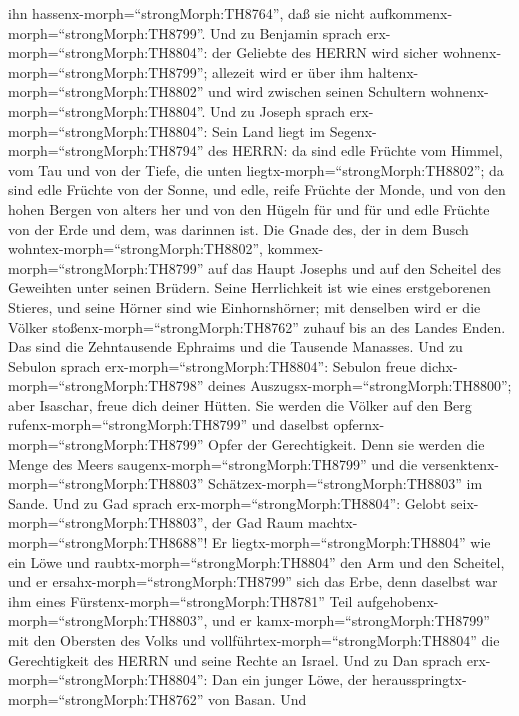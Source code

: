 ihn hassenx-morph=``strongMorph:TH8764'', daß sie nicht
aufkommenx-morph=``strongMorph:TH8799''.  Und zu Benjamin
sprach erx-morph=``strongMorph:TH8804'': der Geliebte des HERRN wird
sicher wohnenx-morph=``strongMorph:TH8799''; allezeit wird er über ihm
haltenx-morph=``strongMorph:TH8802'' und wird zwischen seinen Schultern
wohnenx-morph=``strongMorph:TH8804''.  Und zu Joseph sprach
erx-morph=``strongMorph:TH8804'': Sein Land liegt im
Segenx-morph=``strongMorph:TH8794'' des HERRN: da sind edle Früchte vom
Himmel, vom Tau und von der Tiefe, die unten
liegtx-morph=``strongMorph:TH8802'';  da sind edle Früchte
von der Sonne, und edle, reife Früchte der Monde,  und von
den hohen Bergen von alters her und von den Hügeln für und für
 und edle Früchte von der Erde und dem, was darinnen ist.
Die Gnade des, der in dem Busch wohntex-morph=``strongMorph:TH8802'',
kommex-morph=``strongMorph:TH8799'' auf das Haupt Josephs und auf den
Scheitel des Geweihten unter seinen Brüdern.  Seine
Herrlichkeit ist wie eines erstgeborenen Stieres, und seine Hörner sind
wie Einhornshörner; mit denselben wird er die Völker
stoßenx-morph=``strongMorph:TH8762'' zuhauf bis an des Landes Enden. Das
sind die Zehntausende Ephraims und die Tausende Manasses. 
Und zu Sebulon sprach erx-morph=``strongMorph:TH8804'': Sebulon freue
dichx-morph=``strongMorph:TH8798'' deines
Auszugsx-morph=``strongMorph:TH8800''; aber Isaschar, freue dich deiner
Hütten.  Sie werden die Völker auf den Berg
rufenx-morph=``strongMorph:TH8799'' und daselbst
opfernx-morph=``strongMorph:TH8799'' Opfer der Gerechtigkeit. Denn sie
werden die Menge des Meers saugenx-morph=``strongMorph:TH8799'' und die
versenktenx-morph=``strongMorph:TH8803''
Schätzex-morph=``strongMorph:TH8803'' im Sande.  Und zu Gad
sprach erx-morph=``strongMorph:TH8804'': Gelobt
seix-morph=``strongMorph:TH8803'', der Gad Raum
machtx-morph=``strongMorph:TH8688''! Er
liegtx-morph=``strongMorph:TH8804'' wie ein Löwe und
raubtx-morph=``strongMorph:TH8804'' den Arm und den Scheitel,
 und er ersahx-morph=``strongMorph:TH8799'' sich das Erbe,
denn daselbst war ihm eines Fürstenx-morph=``strongMorph:TH8781'' Teil
aufgehobenx-morph=``strongMorph:TH8803'', und er
kamx-morph=``strongMorph:TH8799'' mit den Obersten des Volks und
vollführtex-morph=``strongMorph:TH8804'' die Gerechtigkeit des HERRN und
seine Rechte an Israel.  Und zu Dan sprach
erx-morph=``strongMorph:TH8804'': Dan ein junger Löwe, der
herausspringtx-morph=``strongMorph:TH8762'' von Basan.  Und
